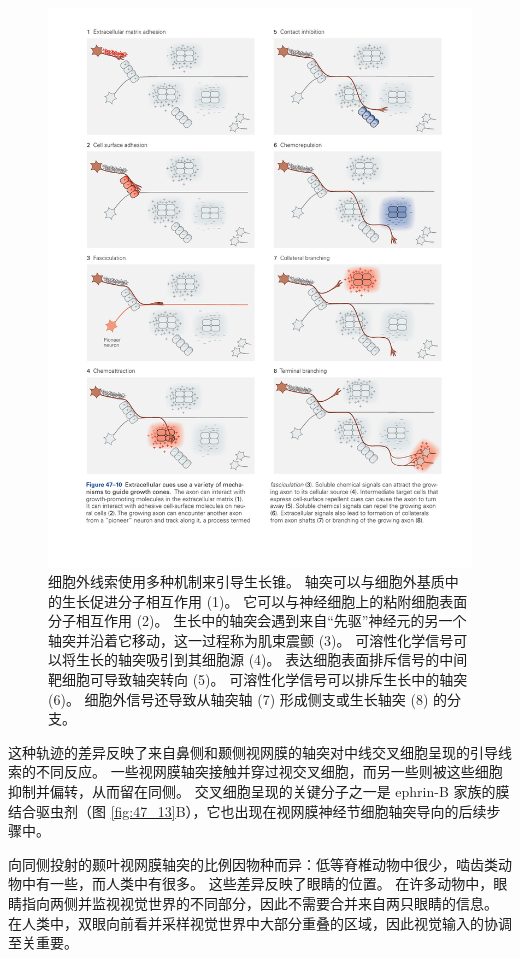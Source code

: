 \begin{figure}[htbp]
	\centering
	\includegraphics[width=0.95\linewidth]{chap47/fig_47_10}
	\caption{细胞外线索使用多种机制来引导生长锥。 轴突可以与细胞外基质中的生长促进分子相互作用 (1)。 它可以与神经细胞上的粘附细胞表面分子相互作用 (2)。 生长中的轴突会遇到来自“先驱”神经元的另一个轴突并沿着它移动，这一过程称为肌束震颤 (3)。 可溶性化学信号可以将生长的轴突吸引到其细胞源 (4)。 表达细胞表面排斥信号的中间靶细胞可导致轴突转向 (5)。 可溶性化学信号可以排斥生长中的轴突 (6)。 细胞外信号还导致从轴突轴 (7) 形成侧支或生长轴突 (8) 的分支。}
	\label{fig:47_10}
\end{figure}

这种轨迹的差异反映了来自鼻侧和颞侧视网膜的轴突对中线交叉细胞呈现的引导线索的不同反应。 一些视网膜轴突接触并穿过视交叉细胞，而另一些则被这些细胞抑制并偏转，从而留在同侧。 交叉细胞呈现的关键分子之一是 ephrin-B 家族的膜结合驱虫剂（图 \ref{fig:47_13}B），它也出现在视网膜神经节细胞轴突导向的后续步骤中。

向同侧投射的颞叶视网膜轴突的比例因物种而异：低等脊椎动物中很少，啮齿类动物中有一些，而人类中有很多。 这些差异反映了眼睛的位置。 在许多动物中，眼睛指向两侧并监视视觉世界的不同部分，因此不需要合并来自两只眼睛的信息。 在人类中，双眼向前看并采样视觉世界中大部分重叠的区域，因此视觉输入的协调至关重要。

